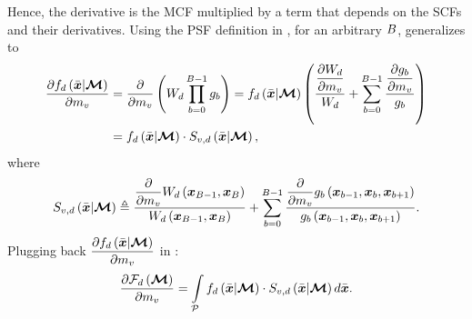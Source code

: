 \documentclass{article}
\begin{document}
Hence, the derivative is the \ac{MCF} multiplied by a term that depends on the \ac{SCF}s and their derivatives. Using the \ac{PSF} definition in \eq{\ref{eq:total_derivative_factor}}, for an arbitrary $B$, \eq{\ref{eq:int_derivative_app}} generalizes to
\begin{equation}
\label{eq:cont_derivative_app}
\begin{split}
\dfrac{\partial {f_{d}\left({\Bar{\boldsymbol{x}}|\boldsymbol{\mathcal{M}}}\right)}}{\partial {m_{v}}} & = \dfrac{\partial}{\partial {m_{v}}}\left({W_{d} \prod_{b=0}^{B-1}{g_{b}}}\right) = f_{d}\left({\Bar{\boldsymbol{x}}|\boldsymbol{\mathcal{M}}}\right)\left({ \frac{\dfrac{\partial {W_{d}}}{\partial {m_{v}}}}{W_{d}}+\sum_{b=0}^{B-1}{  \frac{\dfrac{\partial {g_{b}}}{\partial {m_{v}}}}{g_{b}}}}\right) \\ 
& = f_{d}\left({\Bar{\boldsymbol{x}}|\boldsymbol{\mathcal{M}}}\right) \cdot S_{v,d}\left({\Bar{\boldsymbol{x}}|\boldsymbol{\mathcal{M}}}\right),
\end{split}
\end{equation}
where
\begin{equation}
\label{eq:total_derivative_factor_app}
S_{v, d}\left({\Bar{\boldsymbol{x}}|\boldsymbol{\mathcal{M}}}\right) \triangleq \frac{\dfrac{\partial}{\partial {m_{v}}} W_{d}\left({\boldsymbol{x}_{B-1},\boldsymbol{x}_{B}}\right)}{ W_{d}\left({\boldsymbol{x}_{B-1},\boldsymbol{x}_{B}}\right)}+ \sum_{b=0}^{B-1}{\frac{\dfrac{\partial}{\partial {m_{v}}}g_{b}\left({\boldsymbol{x}_{b-1}, \boldsymbol{x}_{b}, \boldsymbol{x}_{b+1}}\right)}{g_{b}\left({\boldsymbol{x}_{b-1}, \boldsymbol{x}_{b}, \boldsymbol{x}_{b+1}}\right)}}.
\end{equation}
Plugging back $\dfrac{\partial {f_{d}\left({\Bar{\boldsymbol{x}}|\boldsymbol{\mathcal{M}}}\right)}}{\partial {m_{v}}}$ in \eq{\ref{eq:int_derivative_app}}:
\begin{equation}
\label{eq:int_derivative_full_app}
\frac{\partial \forwardmodel_{\nm}\regpar{\sceneparam}}{\partial \scenescalar_{\unknownindex}} =  \intop_{\pathset}{\contfunc_{\nm}\regpar{\ppath|\sceneparam}\cdot \scorefunc_{\unknownindex,\nm}\regpar{\ppath|\sceneparam} d\ppath}.
\end{equation}
\end{document}
